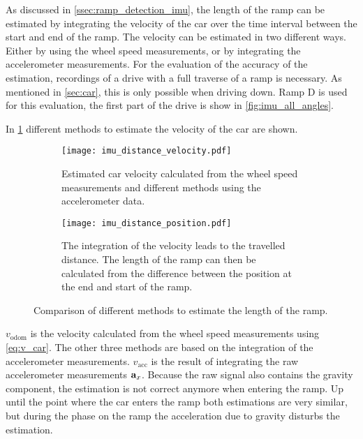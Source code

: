 As discussed in \cref{ssec:ramp_detection_imu}, the length of the ramp can be estimated by integrating the velocity of the car over the time interval between the start and end of the ramp.
The velocity can be estimated in two different ways.
Either by using the wheel speed measurements, or by integrating the accelerometer measurements.
For the evaluation of the accuracy of the estimation, recordings of a drive with a full traverse of a ramp is necessary.
As mentioned in \cref{sec:car}, this is only possible when driving down.
Ramp D is used for this evaluation, the first part of the drive is show in \cref{fig:imu_all_angles}.

In \cref{fig:imu_distance_velocity} different methods to estimate the velocity of the car are shown.
\begin{figure}[b!]
    \centering
    \begin{subfigure}{1\textwidth}
        \centering
        \texttt{[image: imu\_distance\_velocity.pdf]}
        \caption[Car velocity estimation]{Estimated car velocity calculated from the wheel speed measurements and different methods using the accelerometer data.}
        \label{fig:imu_distance_velocity}
    \end{subfigure}
    
    \begin{subfigure}{1\textwidth}
        \centering
        \texttt{[image: imu\_distance\_position.pdf]}
        \caption[Car travelled distance estimation]{The integration of the velocity leads to the travelled distance. The length of the ramp can then be calculated from the difference between the position at the end and start of the ramp.}
        \label{fig:imu_distance_position}
    \end{subfigure}
    \caption[Ramp length estimation using various methods]{Comparison of different methods to estimate the length of the ramp.}
\end{figure}
$v_\mathrm{odom}$ is the velocity calculated from the wheel speed measurements using \cref{eq:v_car}.
The other three methods are based on the integration of the accelerometer measurements.
$v_\mathrm{acc}$ is the result of integrating the raw accelerometer measurements $\vb{a}_x$.
Because the raw signal also contains the gravity component, the estimation is not correct anymore when entering the ramp.
Up until the point where the car enters the ramp both estimations are very similar, but during the phase on the ramp the acceleration due to gravity disturbs the estimation.
